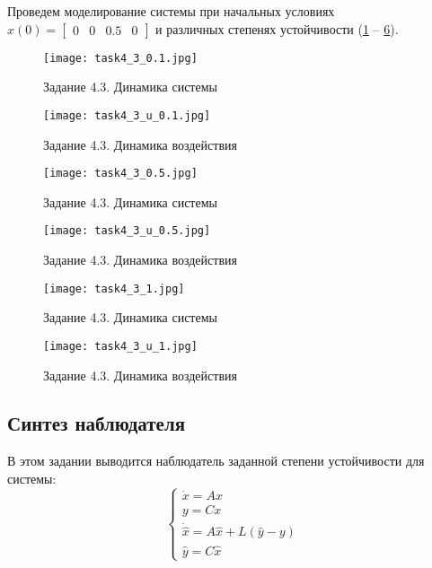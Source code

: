 Проведем моделирование системы при начальных условиях $x(0)=\begin{bmatrix} 0 & 0 & 0.5 & 0 \end{bmatrix}$ и различных степенях устойчивости (\ref{fig:task4_3_0.1} -- \ref{fig:task4_3_u_1}).
\begin{figure}[]
    \centering
    \texttt{[image: task4\_3\_0.1.jpg]}
    \caption{Задание 4.3. Динамика системы}
    \label{fig:task4_3_0.1}
\end{figure}
\begin{figure}[]
    \centering
    \texttt{[image: task4\_3\_u\_0.1.jpg]}
    \caption{Задание 4.3. Динамика воздействия}
    \label{fig:task4_3_u_0.1}
\end{figure}

\begin{figure}[]
    \centering
    \texttt{[image: task4\_3\_0.5.jpg]}
    \caption{Задание 4.3. Динамика системы}
    \label{fig:task4_3_0.5}
\end{figure}
\begin{figure}[]
    \centering
    \texttt{[image: task4\_3\_u\_0.5.jpg]}
    \caption{Задание 4.3. Динамика воздействия}
    \label{fig:task4_3_u_0.5}
\end{figure}

\begin{figure}[]
    \centering
    \texttt{[image: task4\_3\_1.jpg]}
    \caption{Задание 4.3. Динамика системы}
    \label{fig:task4_3_1}
\end{figure}
\begin{figure}[]
    \centering
    \texttt{[image: task4\_3\_u\_1.jpg]}
    \caption{Задание 4.3. Динамика воздействия}
    \label{fig:task4_3_u_1}
\end{figure}


\subsection{Синтез наблюдателя}

В этом задании выводится наблюдатель заданной степени устойчивости для системы:
\[
        \begin{cases}
                \dot{x} = A x \\
                y = C x \\
                \dot{\hat{x}} = A \hat{x} + L(\hat{y} - y) \\
                \hat{y} = C \hat{x}
        \end{cases} 
\]

